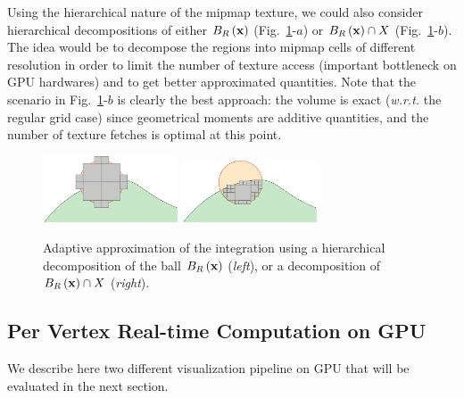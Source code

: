 \documentclass{llncs}
\newcommand{\wrt}{\emph{w.r.t.} }
\begin{document}
Using the hierarchical nature of the mipmap texture, we could also
consider hierarchical decompositions of either $B_{R}\left(\mathbf{x}\right)$
(Fig.~\ref{fig:approx2}-$a$) or $B_{R}\left(\mathbf{x}\right)\cap X$
(Fig.~\ref{fig:approx2}-$b$). The idea would be to decompose the
regions into mipmap cells of different resolution in order to limit
the number of texture access (important bottleneck on GPU hardwares)
and to get better approximated quantities. Note that the scenario in
Fig.~\ref{fig:approx2}-$b$ is clearly the best approach: the
volume is exact  (\wrt the regular grid case) since geometrical moments
are additive quantities, and the number of texture fetches is  optimal
at this point.

\begin{figure}
  \vspace{-0.35cm}
  \begin{center}
    {\includegraphics[width=4cm]{figs/approx-bh}}
    {\includegraphics[width=4cm]{figs/approx-ada}}
  \end{center}
  \vspace{-0.35cm}
  \caption{Adaptive approximation of the integration using a
    hierarchical decomposition of the ball $B_{R}\left(\mathbf{x}\right)$ (\emph{left}), or a decomposition of $B_{R}\left(\mathbf{x}\right)\cap X$ (\emph{right}).}
  \label{fig:approx2}
  \vspace{-0.35cm}
\end{figure}

\subsection{Per Vertex Real-time Computation on GPU}
\label{sec:hierarchical}

We describe here two different visualization pipeline on GPU that will
be evaluated in the next section.
\end{document}
